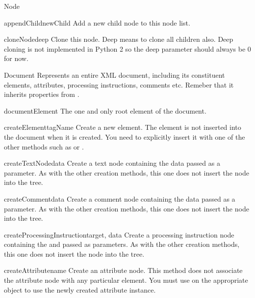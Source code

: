 \begin{classdesc}{Node}{}
\begin{methoddesc}{appendChild}{newChild}
Add a new child node to this node list.
\end{methoddesc}

\begin{methoddesc}{cloneNode}{deep}
Clone this node. Deep means to clone all children also. Deep cloning
is not implemented in Python 2 so the deep parameter should always be
0 for now.
\end{methoddesc}

\end{classdesc}


\begin{classdesc}{Document}{}
Represents an entire XML document, including its constituent elements,
attributes, processing instructions, comments etc.  Remeber that it
inherits properties from .

\begin{memberdesc}{documentElement}
The one and only root element of the document.
\end{memberdesc}

\begin{methoddesc}{createElement}{tagName}
Create a new element.  The element is not inserted into the document
when it is created.  You need to explicitly insert it with one of the
other methods such as  or
.
\end{methoddesc}

\begin{methoddesc}{createTextNode}{data}
Create a text node containing the data passed as a parameter.  As with
the other creation methods, this one does not insert the node into the
tree.
\end{methoddesc}

\begin{methoddesc}{createComment}{data}
Create a comment node containing the data passed as a parameter.  As
with the other creation methods, this one does not insert the node
into the tree.
\end{methoddesc}

\begin{methoddesc}{createProcessingInstruction}{target, data}
Create a processing instruction node containing the  and
 passed as parameters.  As with the other creation methods,
this one does not insert the node into the tree.
\end{methoddesc}

\begin{methoddesc}{createAttribute}{name}
Create an attribute node.  This method does not associate the
attribute node with any particular element.  You must use
 on the appropriate  object
to use the newly created attribute instance.
\end{methoddesc}


\end{classdesc}

